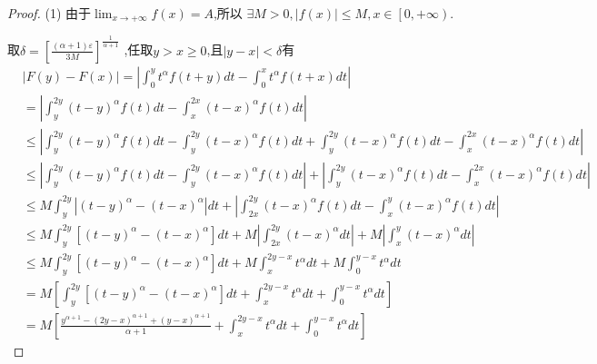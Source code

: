 \documentclass[lang=cn,newtx,10pt,scheme=chinese]{elegantbook}
\begin{document}
\begin{proof}
(1)
由于$\lim_{x\rightarrow +\infty} f\left( x \right) =A$,所以
$\exists M>0,\left| f\left( x \right) \right|\leqslant M,x\in \left[ 0,+\infty \right) $.

取$\delta =\left[ \frac{\left( \alpha +1 \right) \varepsilon}{3M} \right] ^{\frac{1}{\alpha +1}}$
,任取$y>x \geqslant 0$,且$\left| y-x \right|<\delta $有
\begin{align}
&\left| F\left( y \right) -F\left( x \right) \right|=\left| \int_0^y{t^{\alpha}}f\left( t+y \right) dt-\int_0^x{t^{\alpha}}f\left( t+x \right) dt \right| \nonumber
\\
&=\left| \int_y^{2y}{\left( t-y \right) ^{\alpha}}f\left( t \right) dt-\int_x^{2x}{\left( t-x \right) ^{\alpha}}f\left( t \right) dt \right| \nonumber
\\
&\leqslant \left| \int_y^{2y}{\left( t-y \right) ^{\alpha}}f\left( t \right) dt-\int_y^{2y}{\left( t-x \right) ^{\alpha}}f\left( t \right) dt+\int_y^{2y}{\left( t-x \right) ^{\alpha}}f\left( t \right) dt-\int_x^{2x}{\left( t-x \right) ^{\alpha}}f\left( t \right) dt \right| \nonumber
\\
&\leqslant \left| \int_y^{2y}{\left( t-y \right) ^{\alpha}}f\left( t \right) dt-\int_y^{2y}{\left( t-x \right) ^{\alpha}}f\left( t \right) dt \right|+\left| \int_y^{2y}{\left( t-x \right) ^{\alpha}}f\left( t \right) dt-\int_x^{2x}{\left( t-x \right) ^{\alpha}}f\left( t \right) dt \right| \nonumber
\\
&\leqslant M\int_y^{2y}{\left| \left( t-y \right) ^{\alpha}-\left( t-x \right) ^{\alpha} \right|}dt+\left| \int_{2x}^{2y}{\left( t-x \right) ^{\alpha}}f\left( t \right) dt-\int_x^y{\left( t-x \right) ^{\alpha}}f\left( t \right) dt \right| \nonumber
\\
&\leqslant M\int_y^{2y}{\left[ \left( t-y \right) ^{\alpha}-\left( t-x \right) ^{\alpha} \right]}dt+M\left| \int_{2x}^{2y}{\left( t-x \right) ^{\alpha}}dt \right|+M\left| \int_x^y{\left( t-x \right) ^{\alpha}}dt \right| \nonumber
\\
&\leqslant M\int_y^{2y}{\left[ \left( t-y \right) ^{\alpha}-\left( t-x \right) ^{\alpha} \right]}dt+M\int_x^{2y-x}{t^{\alpha}}dt+M\int_0^{y-x}{t^{\alpha}}dt \nonumber
\\
&=M\left[ \int_y^{2y}{\left[ \left( t-y \right) ^{\alpha}-\left( t-x \right) ^{\alpha} \right]}dt+\int_x^{2y-x}{t^{\alpha}}dt+\int_0^{y-x}{t^{\alpha}}dt \right]  \nonumber
\\
&=M\left[ \frac{y^{\alpha +1}-\left( 2y-x \right) ^{\alpha +1}+\left( y-x \right) ^{\alpha +1}}{\alpha +1}+\int_x^{2y-x}{t^{\alpha}}dt+\int_0^{y-x}{t^{\alpha}}dt \right]  \nonumber

\end{align}
\end{proof}
\end{document}

